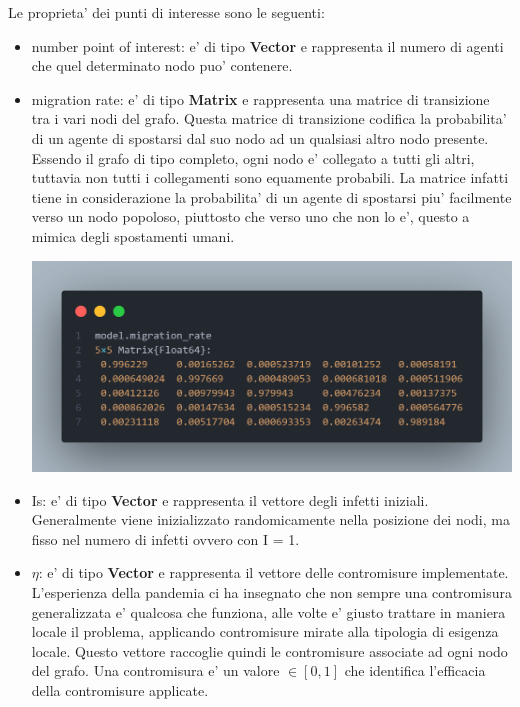 Le proprieta' dei punti di interesse sono le seguenti:
\begin{itemize}
	\item number point of interest: e' di tipo \textbf{Vector} e rappresenta il numero di agenti 
	che quel determinato nodo puo' contenere.
	\item migration rate: e' di tipo \textbf{Matrix} e rappresenta una matrice di transizione tra i 
	vari nodi del grafo. Questa matrice di transizione codifica la probabilita' di un agente di spostarsi
	dal suo nodo ad un qualsiasi altro nodo presente. Essendo il grafo di tipo completo, ogni nodo 
	e' collegato a tutti gli altri, tuttavia non tutti i collegamenti sono equamente probabili.
	La matrice infatti tiene in considerazione la probabilita' di un agente di spostarsi piu' 
	facilmente verso un nodo popoloso, piuttosto che verso uno che non lo e', questo a mimica degli 
	spostamenti umani.
	\begin{minipage}{\linewidth}
		\centering
		\includegraphics[width=\textwidth]{img/travel_rate.png}
		\label{fig:migration_matrix}
	\end{minipage}
	\item Is: e' di tipo \textbf{Vector} e rappresenta il vettore degli infetti iniziali.
	Generalmente viene inizializzato randomicamente nella posizione dei nodi, ma fisso nel numero
	di infetti ovvero con I = 1. 
	\item $\eta$: e' di tipo \textbf{Vector} e rappresenta il vettore delle contromisure implementate.
	L'esperienza della pandemia ci ha insegnato che non sempre una contromisura generalizzata e' qualcosa
	che funziona, alle volte e' giusto trattare in maniera locale il problema, applicando contromisure mirate
	alla tipologia di esigenza locale. Questo vettore raccoglie quindi le contromisure associate ad ogni 
	nodo del grafo. Una contromisura e' un valore $\in [0,1]$ che identifica l'efficacia della contromisure applicate.

\end{itemize}
